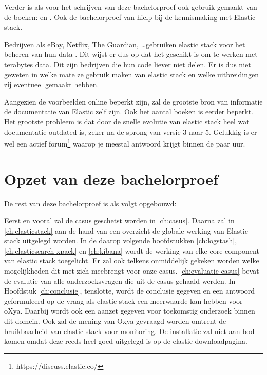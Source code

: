 Verder is als voor het schrijven van deze bachelorproef ook gebruik gemaakt van de boeken: \autocite{logstashboek} en \autocite{monitoringboek}. Ook de bachelorproef van \textcite{bp2016} hielp bij de kennismaking met Elastic stack.

Bedrijven als eBay, Netflix, The Guardian, \dots gebruiken elastic stack voor het beheren van hun data \autocite{15companies}. Dit wijst er dus op dat het geschikt is om te werken met terabytes data. Dit zijn bedrijven die hun code liever niet delen. Er is dus niet geweten in welke mate ze gebruik maken van elastic stack en welke uitbreidingen zij eventueel gemaakt hebben.

Aangezien de voorbeelden online beperkt zijn, zal de grootste bron van informatie de documentatie van Elastic zelf zijn. Ook het aantal boeken is eerder beperkt. Het grootste probleem is dat door de snelle evolutie van elastic stack heel wat documentatie outdated is, zeker na de sprong van versie 3 naar 5. Gelukkig is er wel een actief forum\footnote{https://discuss.elastic.co/} waarop je meestal antwoord krijgt binnen de paar uur.

\section{Opzet van deze bachelorproef}
\label{sec:opzet-bachelorproef}

De rest van deze bachelorproef is als volgt opgebouwd:

Eerst en vooral zal de casus geschetst worden in \ref{ch:casus}. Daarna zal in \ref{ch:elasticstack} aan de hand van een overzicht de globale werking van Elastic stack uitgelegd worden. 
In de daarop volgende hoofdstukken \ref{ch:logstash}, \ref{ch:elasticsearch-xpack} en \ref{ch:kibana} wordt de werking van elke core component van elastic stack toegelicht. Er zal ook telkens onmiddelijk gekeken worden welke mogelijkheden dit met zich meebrengt voor onze casus. 
\ref{ch:evaluatie-casus} bevat de evalutie van alle onderzoeksvragen die uit de casus gehaald werden.
In Hoofdstuk \ref{ch:conclusie}, tenslotte, wordt de conclusie gegeven en een antwoord geformuleerd op de vraag als elastic stack een meerwaarde kan hebben voor oXya. Daarbij wordt ook een aanzet gegeven voor toekomstig onderzoek binnen dit domein. Ook zal de mening van Oxya gevraagd worden omtrent de bruikbaarheid van elastic stack voor monitoring. 
De installatie zal niet aan bod komen omdat deze reeds heel goed uitgelegd is op de elastic downloadpagina.
